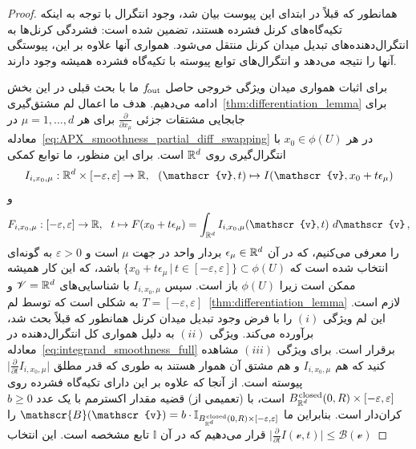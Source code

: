 \begin{proof}
    همانطور که قبلاً در ابتدای این پیوست بیان شد، وجود انتگرال با توجه به اینکه تکیه‌گاه‌های کرنل فشرده هستند، تضمین شده است:
    فشردگی کرنل‌ها به انتگرال‌دهنده‌های تبدیل میدان کرنل منتقل می‌شود.
    همواری آنها علاوه بر این، پیوستگی آنها را نتیجه می‌دهد و انتگرال‌های توابع پیوسته با تکیه‌گاه فشرده همیشه وجود دارند.

    برای اثبات همواری میدان ویژگی خروجی حاصل $f_\textup{\:\!\!out}$ ما با بحث قبلی در این بخش ادامه می‌دهیم.
    هدف ما اعمال لم مشتق‌گیری~\ref{thm:differentiation_lemma} برای جابجایی مشتقات جزئی $\frac{\partial}{\partial x_\mu}$ برای هر $\mu=1,\dots,d$ در معادله~\eqref{eq:APX_smoothness_partial_diff_swapping} در هر $x_0 \in \phi(U)$ با انتگرال‌گیری روی $\mathbb{R}^d$ است.
    برای این منظور، ما توابع کمکی
    \begin{align}
        I_{i,x_0,\mu}: \R^d \times [-\varepsilon,\varepsilon] \to \R,\ \ (\mathscr{v},t) \mapsto I(\mathscr{v}, x_0 + t\epsilon_\mu)
    \end{align}
    و
    \begin{align}
        F_{i,x_0,\mu}: [-\varepsilon,\varepsilon] \to \R,\ \ t \mapsto F(x_0 + t\epsilon_\mu) = \int_{\R^d} I_{i,x_0,\mu}(\mathscr{v},t)\ d\mathscr{v} \,,
    \end{align}
    را معرفی می‌کنیم، که در آن $\epsilon_\mu \in \mathbb{R}^d$ بردار واحد در جهت $\mu$ است و
    $\varepsilon > 0$ به گونه‌ای انتخاب شده است که $\big\{ x_0 + t\epsilon_\mu \,\big|\, t\in [-\varepsilon,\varepsilon] \big\} \subset \phi(U)$ باشد، که این کار همیشه ممکن است زیرا $\phi(U)$ باز است.
    سپس $I_{i,x_0,\mu}$ با شناسایی‌های $\mathscr{V}=\mathbb{R}^d$ و $T=[-\varepsilon,\varepsilon]$ به شکلی است که توسط لم~\ref{thm:differentiation_lemma} لازم است.
    این لم ویژگی $(i)$ را با فرض وجود تبدیل میدان کرنل همانطور که قبلاً بحث شد، برآورده می‌کند.
    ویژگی $(ii)$ به دلیل همواری کل انتگرال‌دهنده در معادله~\eqref{eq:integrand_smoothness_full} برقرار است.
    برای ویژگی $(iii)$ مشاهده کنید که هم $I_{i,x_0,\mu}$ و هم مشتق آن هموار هستند به طوری که قدر مطلق $\big| \frac{\partial}{\partial t} I_{i,x_0,\mu} \big|$ پیوسته است.
    از آنجا که علاوه بر این دارای تکیه‌گاه فشرده روی $B_{\mathbb{R}^d}^{\mkern1.5mu\textup{closed}}(0,R) \times [-\varepsilon,\varepsilon]$ است، با (تعمیمی از) قضیه مقدار اکسترمم با یک عدد $b\geq0$ کران‌دار است.
    بنابراین ما $\mathscr{B}(\mathscr{v}) = b\cdot \mathbb{I}_{B_{\R^d}^{\mkern1.5mu\textup{closed}}(0,R) \times [-\varepsilon,\varepsilon]}$ را قرار می‌دهیم که در آن $\mathbb{I}$ تابع مشخصه است.
    این انتخاب
    $\big| \frac{\partial}{\partial t} I(\mathscr{v},t) \big| \leq \mathscr{B}(\mathscr{v})$

\end{proof}
